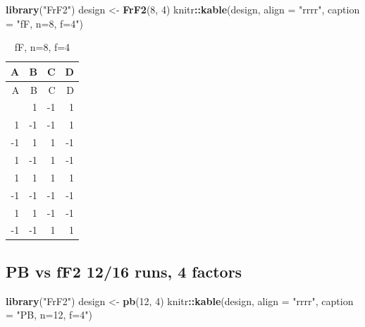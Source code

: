 \documentclass[
  12pt,
  a4paper,
]{article}
\newenvironment{Shaded}{\begin{snugshade}}{\end{snugshade}}
\newcommand{\AttributeTok}[1]{\textcolor[rgb]{0.13,0.29,0.53}{#1}}
\newcommand{\DecValTok}[1]{\textcolor[rgb]{0.00,0.00,0.81}{#1}}
\newcommand{\FunctionTok}[1]{\textcolor[rgb]{0.13,0.29,0.53}{\textbf{#1}}}
\newcommand{\NormalTok}[1]{#1}
\newcommand{\OtherTok}[1]{\textcolor[rgb]{0.56,0.35,0.01}{#1}}
\newcommand{\SpecialCharTok}[1]{\textcolor[rgb]{0.81,0.36,0.00}{\textbf{#1}}}
\newcommand{\StringTok}[1]{\textcolor[rgb]{0.31,0.60,0.02}{#1}}
\numberwithin{equation}{section}
\theoremstyle{plain}
\theoremstyle{definition}
\theoremstyle{remark}
\theoremstyle{note}
\begin{document}
\begin{Shaded}
\begin{Highlighting}[]
\FunctionTok{library}\NormalTok{(}\StringTok{"FrF2"}\NormalTok{)}
\NormalTok{design }\OtherTok{\textless{}{-}} \FunctionTok{FrF2}\NormalTok{(}\DecValTok{8}\NormalTok{, }\DecValTok{4}\NormalTok{)}
\NormalTok{knitr}\SpecialCharTok{::}\FunctionTok{kable}\NormalTok{(design, }\AttributeTok{align =} \StringTok{"rrrr"}\NormalTok{, }\AttributeTok{caption =} \StringTok{"fF, n=8, f=4"}\NormalTok{)}
\end{Highlighting}
\end{Shaded}

\begin{longtable}[]{@{}rrrr@{}}
\caption{fF, n=8, f=4}\tabularnewline
\toprule\noalign{}
A & B & C & D \\
\midrule\noalign{}
\endfirsthead
\toprule\noalign{}
A & B & C & D \\
\midrule\noalign{}
\endhead
\bottomrule\noalign{}
\endlastfoot
-1 & 1 & -1 & 1 \\
1 & -1 & -1 & 1 \\
-1 & 1 & 1 & -1 \\
1 & -1 & 1 & -1 \\
1 & 1 & 1 & 1 \\
-1 & -1 & -1 & -1 \\
1 & 1 & -1 & -1 \\
-1 & -1 & 1 & 1 \\
\end{longtable}

\newpage

\hypertarget{pb-vs-ff2-1216-runs-4-factors}{%
\subsection{PB vs fF2 12/16 runs, 4
factors}\label{pb-vs-ff2-1216-runs-4-factors}}

\begin{Shaded}
\begin{Highlighting}[]
\FunctionTok{library}\NormalTok{(}\StringTok{"FrF2"}\NormalTok{)}
\NormalTok{design }\OtherTok{\textless{}{-}} \FunctionTok{pb}\NormalTok{(}\DecValTok{12}\NormalTok{, }\DecValTok{4}\NormalTok{)}
\NormalTok{knitr}\SpecialCharTok{::}\FunctionTok{kable}\NormalTok{(design, }\AttributeTok{align =} \StringTok{"rrrr"}\NormalTok{, }\AttributeTok{caption =} \StringTok{"PB, n=12, f=4"}\NormalTok{)}
\end{Highlighting}
\end{Shaded}
\end{document}
